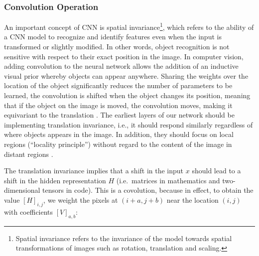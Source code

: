 \documentclass[12pt,a4paper]{scrartcl}
\begin{document}
\subsubsection{Convolution Operation}
An important concept of CNN is spatial invariance\footnote{Spatial invariance refers to the invariance of the model towards spatial transformations of images such as rotation, translation and scaling.}, which refers to the ability of a CNN model to recognize and identify features even when the input is transformed or slightly modified. In other words, object recognition is not sensitive with respect to their exact position in the image. In computer vision, adding convolution to the neural network allows the addition of an inductive visual prior whereby objects can appear anywhere. Sharing the weights over the location of the object significantly reduces the number of parameters to be learned, the convolution is shifted when the object changes its position, meaning that if the object on the image is moved, the convolution moves, making it equivariant to the translation  \cite{CNNSpatialLocation}. The earliest layers of our network should be implementing translation invariance, i.e., it should respond similarly regardless of where objects appears in the image. In addition, they should focus on local regions (``locality principle'') without regard to the content of the image in distant regions \cite{DIDLBook}.

The translation invariance implies that a shift in the input \(x\) should lead to a shift in the hidden representation \(H\) (i.e.~matrices in mathematics and two-dimensional tensors in code). 
This is a covolution, because in effect, to obtain the value \([H]_{i,j}\), we weight the pixels at \((i + a, j + b)\) near the location \((i, j)\) with coefficients \([V]_{a,b}\):
 
\end{document}
